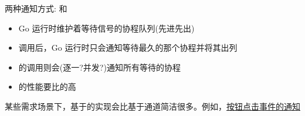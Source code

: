 \begin{frame}{两种通知方式: 和}
   \begin{itemize}
       \item Go 运行时维护着等待信号的协程队列(先进先出)
       \item {}调用后，Go 运行时只会通知等待最久的那个协程并将其出列
       \item {}的调用则会(逐一?并发?)通知所有等待的协程
       \item \Cond 的性能要比\channel 的高
   \end{itemize} 

   某些需求场景下，基于\Cond 的实现会比基于通道\channel 简洁很多。例如，\href{https://github.com/sammyne/concurrency-in-go/blob/master/chapter03/sync.pkg/cond/boardcast.go}{按钮点击事件的通知}
\end{frame}